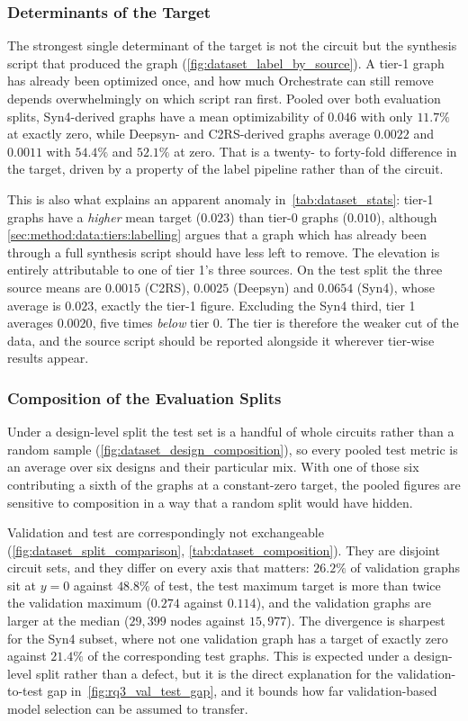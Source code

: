 \subsubsection{Determinants of the Target}
\label{sec:method:data:statistics:source}
The strongest single determinant of the target is not the circuit but the synthesis script
that produced the graph (\ref{fig:dataset_label_by_source}). A tier-1 graph has already been
optimized once, and how much Orchestrate can still remove depends overwhelmingly on which
script ran first. Pooled over both evaluation splits, Syn4-derived graphs have a mean
optimizability of $0.046$ with only $11.7\%$ at exactly zero, while Deepsyn- and
C2RS-derived graphs average $0.0022$ and $0.0011$ with $54.4\%$ and $52.1\%$ at zero. That is
a twenty- to forty-fold difference in the target, driven by a property of the label pipeline
rather than of the circuit.

This is also what explains an apparent anomaly in~\ref{tab:dataset_stats}: tier-1 graphs have
a \emph{higher} mean target ($0.023$) than tier-0 graphs ($0.010$), although
\ref{sec:method:data:tiers:labelling} argues that a graph which has already been through a
full synthesis script should have less left to remove. The elevation is entirely attributable
to one of tier 1's three sources. On the test split the three source means are $0.0015$
(C2RS), $0.0025$ (Deepsyn) and $0.0654$ (Syn4), whose average is $0.023$, exactly the
tier-1 figure. Excluding the Syn4 third, tier 1 averages $0.0020$, five times \emph{below}
tier 0. The tier is therefore the weaker cut of the data, and the source script should be
reported alongside it wherever tier-wise results appear.

\subsubsection{Composition of the Evaluation Splits}
\label{sec:method:data:statistics:splits}
Under a design-level split the test set is a handful of whole circuits rather than a random
sample (\ref{fig:dataset_design_composition}), so every pooled test metric is an average over
six designs and their particular mix. With one of those six contributing a sixth of the
graphs at a constant-zero target, the pooled figures are sensitive to composition in a way
that a random split would have hidden.

Validation and test are correspondingly not exchangeable
(\ref{fig:dataset_split_comparison}, \ref{tab:dataset_composition}). They are disjoint
circuit sets, and they differ on every axis that matters: $26.2\%$ of validation graphs sit
at $y = 0$ against $48.8\%$ of test, the test maximum target is more than twice the
validation maximum ($0.274$ against $0.114$), and the validation graphs are larger at the
median ($29{,}399$ nodes against $15{,}977$). The divergence is sharpest for the Syn4 subset,
where not one validation graph has a target of exactly zero against $21.4\%$ of the
corresponding test graphs. This is expected under a design-level split rather than a defect,
but it is the direct explanation for the validation-to-test gap
in~\ref{fig:rq3_val_test_gap}, and it bounds how far validation-based model selection can be
assumed to transfer.

